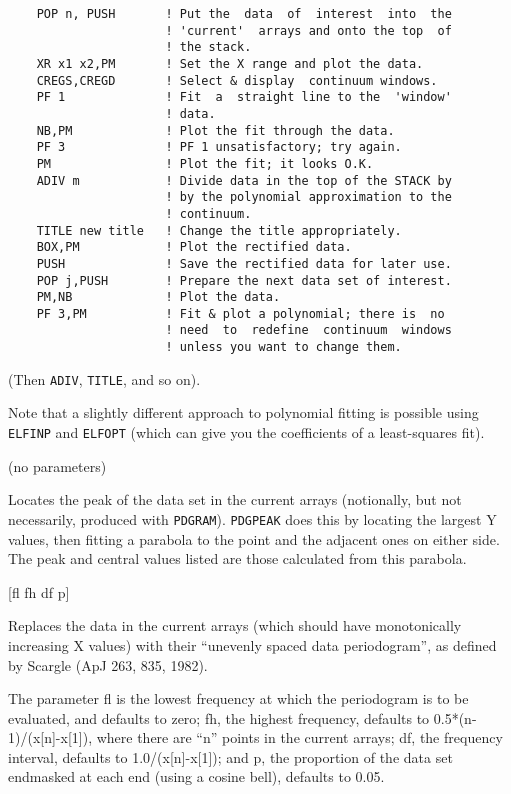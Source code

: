 \documentclass[twoside,11pt]{article}
\newcommand{\htmlref}[2]{#1}
\newcommand{\xlabel}[1]{}
\renewcommand{\_}{\texttt{\symbol{95}}}
\newcommand{\dipcom}[3] { \item [{#1}] {#2} \par }
\newcommand{\dipcom}[3] { \end{description}
                            \subsection{\xlabel{#1}{#1} - {#3}}
                            \label{COM:#1}
                            \begin{description}
                            \item [Syntax:] {\tt{#1} {#2}}
                            \par
                            \item [Description:]}
\begin{document}
\begin {description}
\begin{verbatim}
    POP n, PUSH       ! Put the  data  of  interest  into  the
                      ! 'current'  arrays and onto the top  of
                      ! the stack.
    XR x1 x2,PM       ! Set the X range and plot the data.
    CREGS,CREGD       ! Select & display  continuum windows.
    PF 1              ! Fit  a  straight line to the  'window'
                      ! data.
    NB,PM             ! Plot the fit through the data.
    PF 3              ! PF 1 unsatisfactory; try again.
    PM                ! Plot the fit; it looks O.K.
    ADIV m            ! Divide data in the top of the STACK by
                      ! by the polynomial approximation to the
                      ! continuum.
    TITLE new title   ! Change the title appropriately.
    BOX,PM            ! Plot the rectified data.
    PUSH              ! Save the rectified data for later use.
    POP j,PUSH        ! Prepare the next data set of interest.
    PM,NB             ! Plot the data.
    PF 3,PM           ! Fit & plot a polynomial; there is  no
                      ! need  to  redefine  continuum  windows
                      ! unless you want to change them.
\end{verbatim}

(Then \htmlref{{\tt{ADIV}}}{COM:ADIV},  \htmlref{{\tt{TITLE}}}{COM:TITLE},  and so on).

Note that a slightly different approach to polynomial fitting is
possible using \htmlref{{\tt{ELFINP}}}{COM:ELFINP}  and \htmlref{{\tt{ELFOPT}}}{COM:ELFOPT}  (which can give you the coefficients
of a least-squares fit).

\dipcom{PDGPEAK}{(no parameters)}{Locates the peak of a data set}
Locates the peak of the data set in the current arrays (notionally, but
not necessarily, produced with \htmlref{{\tt{PDGRAM}}}{COM:PDGRAM}).  \htmlref{{\tt{PDGPEAK}}}{COM:PDGPEAK}  does this by locating
the largest Y values, then fitting a parabola to the point and the
adjacent ones on either side. The peak and central values listed are
those calculated from this parabola.

\dipcom{PDGRAM}{[fl fh df p]}{Takes the "unevenly spaced data periodogram" of the current arrays}
Replaces the data in the current arrays (which should have
monotonically increasing X values) with their ``unevenly spaced data
periodogram'', as defined by Scargle (ApJ 263, 835, 1982).

The parameter fl is the lowest frequency at which the periodogram is
to be evaluated, and defaults to zero; fh, the highest frequency,
defaults to 0.5*(n-1)/(x[n]-x[1]), where there are ``n'' points in the
current arrays; df, the frequency interval, defaults to
1.0/(x[n]-x[1]); and p, the proportion of the data set endmasked at
each end (using a cosine bell), defaults to 0.05.


\end{description}
\end{document}
